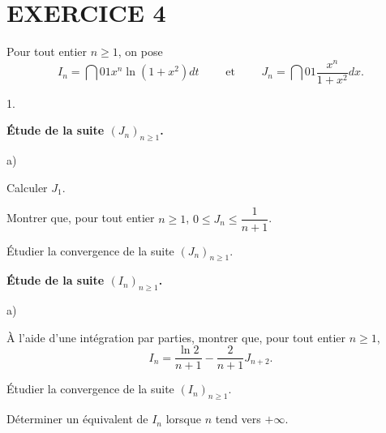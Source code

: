 \documentclass[11pt]{article}%
\begin{document}
\section*{EXERCICE 4}

Pour tout entier $n\geq 1$, on pose 
\[
I_{n} = \dint{0}{1}x^{n}\ln (1 + x^{2})dt\quad \quad \text{ et }\quad
\quad J_{n} = \dint{0}{1}\dfrac{x^{n}}{1 + x^{2}}dx.
\]

\begin{noliste}{1.}
 \setlength{\itemsep}{4mm}
\item \textbf{Étude de la suite $(J_{n})_{n\geq 1}$.}

\begin{noliste}{a)}
 \setlength{\itemsep}{2mm}
\item Calculer $J_{1}$.

\item Montrer que, pour tout entier $n\geq 1$, $0\leq
J_{n}\leq \dfrac{1}{n + 1}$.

\item Étudier la convergence de la suite $(J_{n})_{n\geq 1}$.
\end{noliste}

\item \textbf{Étude de la suite $(I_{n})_{n\geq 1}$.}

\begin{noliste}{a)}
 \setlength{\itemsep}{2mm}
\item À l'aide d'une intégration par parties, montrer que, pour tout
entier $n\geq 1$, 
\[
I_{n} = \dfrac{\ln 2}{n + 1}-\dfrac{2}{n + 1}J_{n + 2}.
\]

\item Étudier la convergence de la suite $(I_{n})_{n\geq 1}$.

\item Déterminer un équivalent de $I_{n}$ lorsque $n$ tend vers $ +
\infty $.
\end{noliste}
\end{noliste}

\label{fin}
\end{document}
